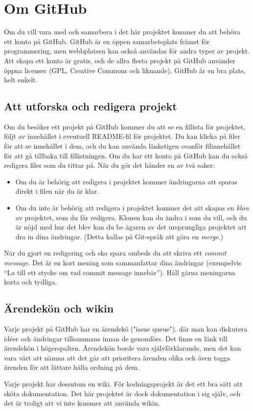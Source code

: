 \section{Om GitHub}

Om du vill vara med och samarbera i det här projektet kommer du att behöva ett konto på GitHub.
GitHub är en öppen samarbetsplats främst för programmering, men webbplatsen kan också användas för andra typer av projekt.
Att skapa ett konto är gratis, och de allra flesta projekt på GitHub använder öppna licenser (GPL, Creative Commons och liknande).
GitHub är en bra plats, helt enkelt.


\subsection{Att utforska och redigera projekt}

Om du besöker ett projekt på GitHub kommer du att se en fillista för projektet, följt av innehållet i eventuell README-fil för projektet.
Du kan klicka på filer för att se innehållet i dem, och du kan använda länkstigen ovanför filinnehållet för att gå tillbaka till fillistningen.
Om du har ett konto på GitHub kan du också redigera filer som du tittar på.
När du gör det händer en av två saker:

\begin{itemize}

\item Om du är behörig att redigera i projektet kommer ändringarna att sparas direkt i filen när du är klar.
\item Om du inte är behörig att redigera i projektet kommer det att skapas en \emph{klon} av projektet, som du får redigera.
Klonen kan du ändra i som du vill, och du är nöjd med hur det blev kan du be ägaren av det ursprungliga projektet att dra in dina ändringar.
(Detta kallas på Git-språk att göra en \emph{merge}.)

\end{itemize}

När du gjort en redigering och ska spara ombeds du att skriva ett \emph{commit message}.
Det är en kort mening som sammanfattar dina ändringar (exempelvis ``La till ett stycke om vad commit message innebär'').
Håll gärna meningarna korta och tydliga.


\subsection{Ärendekön och wikin}

Varje projekt på GitHub har en ärendekö ("issue queue"), där man kan diskutera idéer och ändringar tillsammans innan de genomförs.
Det finns en länk till ärendekön i högerspalten.
Ärendekön borde vara självförklarande, men det kan vara värt att nämna att det går att prioritera ärenden olika och även tagga ärenden för att lättare hålla ordning på dem.

Varje projekt har dessutom en wiki. För kodningsprojekt är det ett bra sätt att sköta dokumentation.
Det här projektet är dock dokumentation i sig själv, och det är troligt att vi inte kommer att använda wikin.

